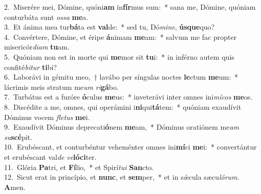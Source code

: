 {2.~}Miserére mei, Dómine, quóni\textbf{am} in\textbf{fír}mus sum:~* sana me, Dómine, quóniam conturbáta sunt \textit{os}\textit{sa} \textbf{me}a.\\
{3.~}Et ánima mea tur\textbf{bá}ta est \textbf{val}de:~* sed tu, Dó\textit{mi}\textit{ne}, \textbf{ús}\textbf{que}quo?\\
{4.~}Convértere, Dómine, et éripe \textbf{á}nimam \textbf{me}am:~* salvum me fac propter misericór\textit{di}\textit{am} \textbf{tu}am.\\
{5.~}Quóniam non est in morte qui \textbf{me}mor sit \textbf{tu}i:~* in inférno autem quis confité\textit{bi}\textit{tur} \textbf{ti}bi?\\
{6.~}Laborávi in gémitu meo,~† lavábo per síngulas noctes \textbf{le}ctum \textbf{me}um:~* lácrimis meis stratum me\textit{um} \textit{ri}\textbf{gá}bo.\\
{7.~}Turbátus est a furóre \textbf{ó}culus \textbf{me}us:~* inveterávi inter omnes ini\textit{mí}\textit{cos} \textbf{me}os.\\
{8.~}Discédite a me, omnes, qui operámini i\textbf{ni}qui\textbf{tá}tem:~* quóniam exaudívit Dóminus vocem \textit{fle}\textit{tus} \textbf{me}i.\\
{9.~}Exaudívit Dóminus deprecati\textbf{ó}nem \textbf{me}am,~* Dóminus oratiónem me\textit{am} \textit{su}\textbf{scé}pit.\\
{10.~}Erubéscant, et conturbéntur veheménter omnes ini\textbf{mí}ci \textbf{me}i:~* convertántur et erubéscant val\textit{de} \textit{ve}\textbf{ló}\textbf{ci}ter.\\
{11.~}Glória \textbf{Pa}tri, et \textbf{Fí}lio,~* et Spirí\textit{tu}\textit{i} \textbf{San}cto.\\
{12.~}Sicut erat in princípio, et \textbf{nunc}, et \textbf{sem}per,~* et in sǽcula sæcu\textit{ló}\textit{rum}. \textbf{A}men.\\
